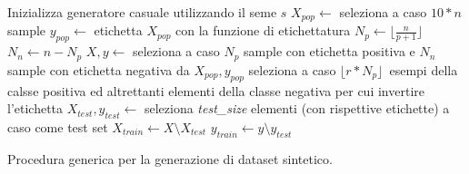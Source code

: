 \begin{algorithm}
    \SetAlgoLined
    Inizializza generatore casuale utilizzando il seme $s$\;
    $X_{pop} \gets$ seleziona a caso $10*n$ sample\;
    $y_{pop} \gets$ etichetta $X_{pop}$ con la funzione di etichettatura\;
    $N_p \gets \lfloor\frac{n}{p + 1}\rfloor$\;
    $N_n \gets n - N_p$\;
    $X, y \gets$ seleziona a caso $N_p$ sample con etichetta positiva e $N_n$ sample con etichetta negativa da $X_{pop},y_{pop}$\;
    seleziona a caso $\lfloor r * N_p \rfloor$\ esempi della calsse positiva ed altrettanti elementi della classe negativa per cui invertire l'etichetta\;
    $X_{test}, y_{test} \gets$ seleziona \textit{test\_size} elementi (con rispettive etichette) a caso come test set\;
    $X_{train} \gets X \setminus X_{test}$\;
    $y_{train} \gets y \setminus y_{test}$\;
\caption{Procedura generica per la generazione di dataset sintetico.}
\label{alg:generazione_dataset_sintetici}
\end{algorithm}

